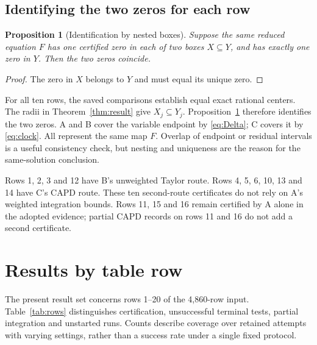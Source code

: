 \documentclass[10pt,a4paper]{article}
\newtheorem{proposition}[theorem]{Proposition}
\theoremstyle{remark}
\begin{document}
\subsection{Identifying the two zeros for each row}
\label{sec:samezero}
\begin{proposition}[Identification by nested boxes]
\label{prop:same}
Suppose the same reduced equation $F$ has one certified zero in each
of two boxes $X\subseteq Y$, and has exactly one zero in $Y$. Then the
two zeros coincide.
\end{proposition}
\begin{proof}
The zero in $X$ belongs to $Y$ and must equal its unique zero.
\end{proof}

For all ten rows, the saved comparisons establish equal exact rational
centers. The radii in Theorem~\ref{thm:result} give $X_j\subseteq Y_j$.
Proposition~\ref{prop:same} therefore identifies the two zeros. A and B
cover the variable endpoint by \eqref{eq:Delta}; C covers it by
\eqref{eq:clock}. All represent the same map $F$. Overlap of endpoint
or residual intervals is a useful consistency check, but nesting and
uniqueness are the reason for the same-solution conclusion.

Rows 1, 2, 3 and 12 have B's unweighted Taylor route. Rows 4, 5, 6,
10, 13 and 14 have C's CAPD route. These ten second-route certificates
do not rely on A's weighted integration bounds. Rows 11, 15 and 16
remain certified by A alone in the adopted evidence; partial CAPD
records on rows 11 and 16 do not add a second certificate.

\section{Results by table row}
\label{sec:results}
The present result set concerns rows 1--20 of the 4,860-row input.
Table~\ref{tab:rows} distinguishes certification, unsuccessful
terminal tests, partial integration and unstarted runs. Counts describe
coverage over retained attempts with varying settings, rather than a
success rate under a single fixed protocol.
\end{document}
